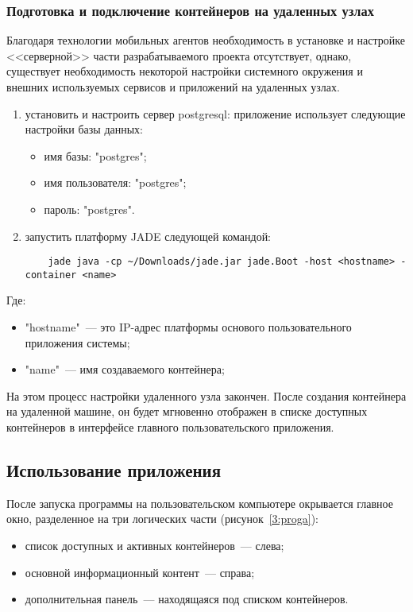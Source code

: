\subsubsection{Подготовка и подключение контейнеров на удаленных узлах}
Благодаря технологии мобильных агентов необходимость в установке и настройке <<серверной>> части разрабатываемого проекта отсутствует, однако, существует необходимость некоторой настройки системного окружения и внешних используемых сервисов и приложений на удаленных узлах.
\begin{enumerate}
\item установить и настроить сервер postgresql: приложение использует следующие настройки базы данных:
    \begin{itemize}
        \item имя базы: "postgres";
        \item имя пользователя: "postgres";
        \item пароль: "postgres".
    \end{itemize}
\item запустить платформу JADE следующей командой:
    \begin{lstlisting}
    jade java -cp ~/Downloads/jade.jar jade.Boot -host <hostname> -container <name>
    \end{lstlisting}
\end{enumerate}
Где:
\begin{itemize}
    \item "hostname"~--- это IP-адрес платформы основого пользовательного приложения системы;
    \item "name"~--- имя создаваемого контейнера;
\end{itemize}
На этом процесс настройки удаленного узла закончен. После создания контейнера на удаленной машине, он будет мгновенно отображен в списке доступных контейнеров в интерфейсе главного пользовательского приложения.

\subsection{Использование приложения}
После запуска программы на пользовательском компьютере окрывается главное окно, разделенное на три логических части (рисунок~\ref{3:proga}):
\begin{itemize}
\item список доступных и активных контейнеров~--- слева;
\item основной информационный контент~--- справа;
\item дополнительная панель~--- находящаяся под списком контейнеров.
\end{itemize}

